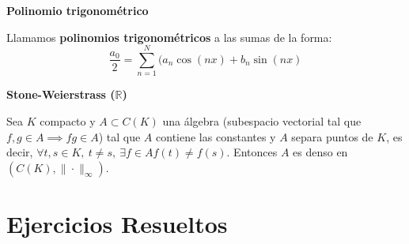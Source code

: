 \documentclass[openany]{book}
\begin{document}
\begin{definition}
  \textbf{Polinomio trigonométrico}

  Llamamos \textbf{polinomios trigonométricos} a las sumas de la forma:
  $$ \dfrac{a_0}{2} = \sum\limits_{n=1}^{N}(a_n \cos(nx)+b_n \sin(nx) $$

\end{definition}

\begin{theorem}
  \textbf{Stone-Weierstrass ($ \mathbb{R} $)}

  Sea $ K $ compacto  y $ A \subset C(K) $ una álgebra (subespacio vectorial tal que $ f,g \in A \implies fg \in A $) tal que $ A  $ contiene las constantes y $ A $ separa puntos de $ K $, es decir, $ \forall t,s \in K,\ t\ne s,\ \exists f \in A f(t) \ne f(s) $. Entonces $ A $ es denso en $ (C(K),\|\cdot \|_{\infty}) $.
\end{theorem}





\chapter{Ejercicios Resueltos}
\end{document}
